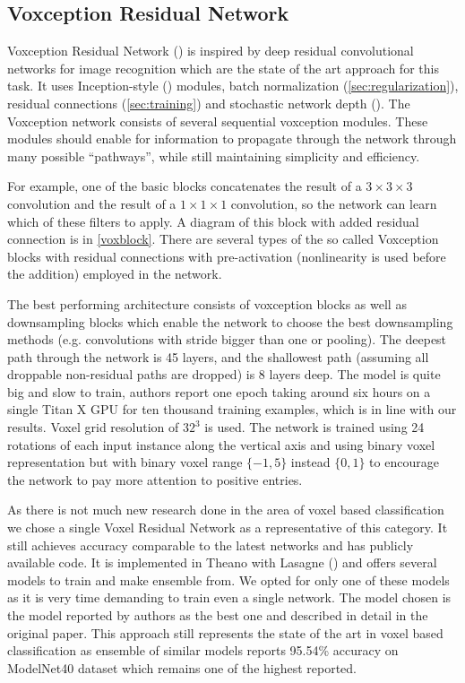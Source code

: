 \subsection{Voxception Residual Network}
Voxception Residual Network (\cite{brock_generative_2016}) is inspired by deep residual convolutional networks for image recognition which are the state of the art approach for this task. It uses Inception-style (\cite{szegedy_inception-v4_2016}) modules, batch normalization (\autoref{sec:regularization}), residual connections (\autoref{sec:training}) and stochastic network depth (\cite{huang_deep_2016}). The Voxception network consists of several sequential voxception modules. These modules  should enable for information to propagate through the network through many possible “pathways”, while still maintaining simplicity and efficiency. \par
For example, one of the basic blocks concatenates the result of a $3\times3\times3$ convolution and the result of a $1\times1\times1$ convolution, so the network can learn which of these filters to apply. A diagram of this block with added residual connection is in \autoref{voxblock}. There are several types of the so called Voxception blocks with residual connections with pre-activation (nonlinearity is used before the addition) employed in the network. \par
The best performing architecture consists of voxception blocks as well as downsampling blocks which enable the network to choose the best downsampling methods (e.g. convolutions with stride bigger than one or pooling). The deepest path through the network is 45 layers, and the shallowest path (assuming all droppable non-residual paths are dropped) is 8 layers deep.
The model is quite big and slow to train, authors report one epoch taking around six hours on a single Titan X GPU for ten thousand training examples, which is in line with our results.
Voxel grid resolution of $32^3$ is used. The network is trained using 24 rotations of each input instance along the vertical axis and using binary voxel representation but with binary voxel range $\{-1,5\}$ instead $\{0,1\}$  to encourage the network to pay more attention to positive entries. \par
As there is not much new research done in the area of voxel based classification we chose a single Voxel Residual Network as a representative of this category. It still achieves accuracy comparable to the latest networks and has publicly available code. It is implemented in Theano with Lasagne (\cite{brock_vrn_2016}) and offers several models to train and make ensemble from. We opted for only one of these models as it is very time demanding to train even a single network. The model chosen is the model reported by authors as the best one and described in detail in the original paper. 
This approach still represents the state of the art in voxel based classification as ensemble of similar models reports 95.54\% accuracy on ModelNet40 dataset which remains one of the highest reported.

